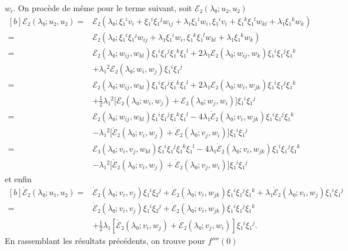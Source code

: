 \documentclass[12pt, final]{amsart}
\theoremstyle{definition}
\begin{document}
\(w_i\). On procède de même pour le terme suivant, soit \(ℰ₂(λ₀; u₂, u₂)\)
\begin{equation*}
  \begin{aligned}[b]
    ℰ₂(λ₀; u₂, u₂)
    ={} & ℰ₂(λ₀ ; ξ₁^i v_i + ξ₁^i ξ₁^j w_{i j} + λ₁ ξ₁^i w_i, ξ₁^i v_i + ξ₁^k ξ₁^l w_{k l} + λ₁ ξ₁^k w_k)\\
    ={} & ℰ₂(λ₀; ξ₁^i ξ₁^j w_{i j} + λ₁ ξ₁^i w_i, ξ₁^k ξ₁^l w_{k l} + λ₁ ξ₁^k w_k)\\
    ={} & ℰ₂(λ₀; w_{i j}, w_{k l}) ξ₁^i ξ₁^j ξ₁^k ξ₁^l + 2 λ₁ ℰ₂(λ₀ ; w_{i j}, w_k) ξ₁^i ξ₁^j ξ₁^k\\
    & + λ₁^2 ℰ₂(λ₀; w_i, w_j) ξ₁^i ξ₁^j\\
    ={} & ℰ₂(λ₀; w_{i j}, w_{k l}) ξ₁^i ξ₁^j ξ₁^k ξ₁^l + 2 λ₁ ℰ₂(λ₀ ; w_i, w_{j k}) ξ₁^i ξ₁^j ξ₁^k\\
    & + \tfrac{1}{2} λ₁^2 \bigl[ℰ₂(λ₀; w_i, w_j) + ℰ₂(λ₀; w_j, w_i)\bigr] ξ₁^i ξ₁^j\\
    ={} & ℰ₂(λ₀; w_{i j}, w_{k l}) ξ₁^i ξ₁^j ξ₁^k ξ₁^l - 4 λ₁ \dot{ℰ}₂ (λ₀; v_i, w_{j k}) ξ₁^i ξ₁^j ξ₁^k\\
    & - λ₁^2 \bigl[\dot{ℰ}₂(λ₀; v_i, w_j) + \dot{ℰ}₂(λ₀; v_j, w_i)\bigr] ξ₁^i ξ₁^j\\
    ={} & ℰ₃(λ₀; v_i, v_j, w_{k l}) ξ₁^i ξ₁^j ξ₁^k ξ₁^l - 4 λ₁ \dot{ℰ}₂(λ₀; v_i, w_{j k}) ξ₁^i ξ₁^j ξ₁^k\\
    & - λ₁^2 \bigl[\dot{ℰ}₂(λ₀; v_i, w_j) + \dot{ℰ}₂(λ₀; v_j, w_i)\bigr] ξ₁^i ξ₁^j
  \end{aligned}
\end{equation*}
et enfin
\begin{equation*}
  \begin{aligned}[b]
    \dot{ℰ}₂(λ₀; u₁, u₂)
    ={} & \dot{ℰ}₂ (λ₀; v_i, v_j) ξ₁^i ξ₂^j + \dot{ℰ}₂(λ₀ ; v_i, w_{j k}) ξ₁^i ξ₁^j ξ₁^k + λ₁ \dot{ℰ}₂(λ₀; v_i, w_j) ξ₁^i ξ₁^j\\
    ={} & \dot{ℰ}₂(λ₀; v_i, v_j) ξ₁^i ξ₂^j + \dot{ℰ}₂(λ₀; v_i, w_{j k}) ξ₁^i ξ₁^j ξ₁^k\\
    & + \tfrac{1}{2} λ₁ [\dot{ℰ}₂(λ₀ ; v_i, w_j) + \dot{ℰ}₂(λ₀; v_j, w_i)] ξ₁^i ξ₁^j.
  \end{aligned}
\end{equation*}
En rassemblant les résultats précédents, on trouve pour \(f''''(0)\)
\end{document}
